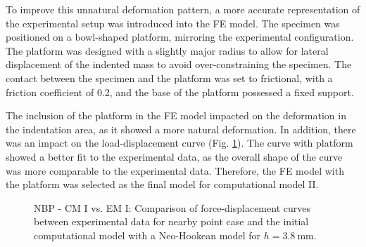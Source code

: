 To improve this unnatural deformation pattern, a more accurate representation of the 
experimental setup was introduced into the FE model. The specimen was positioned on a bowl-shaped
platform, mirroring the experimental configuration. The platform was designed with a slightly major radius to allow 
for lateral displacement of the indented mass to avoid over-constraining the specimen. The contact 
between the specimen and the platform was set to frictional, with a friction coefficient of 0.2, and the base of the platform 
possessed a fixed support.

The inclusion of the platform in the FE model impacted on the deformation in the indentation area, 
as it showed a more natural deformation. In addition, there was an impact on the load-displacement curve (Fig. \ref{fig:noplatformvsplatform}). 
The curve with platform showed a better fit to the experimental data, as the overall shape of the curve was more 
comparable to the experimental data. Therefore, the FE model with the platform was selected as the final model for computational 
model II.\\
\begin{figure}%
    \centering
   \quad
   \caption[CP II: No platform vs. with platform]{NBP - CM I vs. EM I: Comparison of force-displacement curves between experimental data for nearby point case and the initial computational model with a Neo-Hookean model for $h = \SI{3.8}{\milli \meter}$.}%
   \label{fig:noplatformvsplatform}%
\end{figure}

